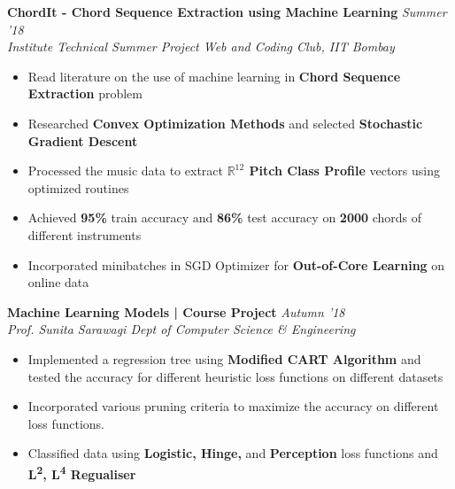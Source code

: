 \documentclass[11pt]{article}%
\begin{document}
{\flushleft \bf \large{ChordIt - Chord Sequence Extraction using Machine Learning}} \hfill {{{\em {Summer '18}}}}\\
{\em{Institute Technical Summer Project \textbar Web and Coding Club, IIT Bombay}}
\begin{itemize}
\vspace{-0.2cm}
\setlength\itemsep{0.01em}
\item Read literature on the use of machine learning in {\bf Chord Sequence Extraction} problem
\vspace{-1.2mm}
\item Researched {\bf Convex Optimization Methods} and selected {\bf Stochastic Gradient Descent}
\vspace{-1.2mm}
\item  Processed the music data to extract {\bf $\mathbb{R}^{12}$ Pitch Class Profile} vectors using optimized routines
\vspace{-1.2mm}
\item Achieved {\bf 95\%} train accuracy and {\bf 86\%} test accuracy on {\bf 2000} chords of different instruments
\vspace{-1.2mm}
\item  Incorporated minibatches in SGD Optimizer for {\bf Out-of-Core Learning} on online data
\vspace{-1.2mm}
\end{itemize}
\vspace{-4mm}

{\flushleft \bf \large{Machine Learning Models | Course Project}} \hfill {{{\em{Autumn '18}}}} \\
{\em{Prof. Sunita Sarawagi \textbar Dept of Computer Science \& Engineering}}
\vspace{-1mm}
\begin{itemize}
\setlength\itemsep{0.01em}
\vspace{-1mm}
\item Implemented a regression tree using {\bf Modified CART Algorithm} and tested the accuracy for
different heuristic loss functions on different datasets
\vspace{-1mm}
\item Incorporated various pruning criteria to maximize the accuracy on different loss functions.
\vspace{-1mm}
\item Classified data using {\bf Logistic, Hinge,} and {\bf Perception} loss functions and {\bf L\textsuperscript{2}, L\textsuperscript{4} Regualiser}
\end{itemize}
\vspace{-0.5cm}
\end{document}
